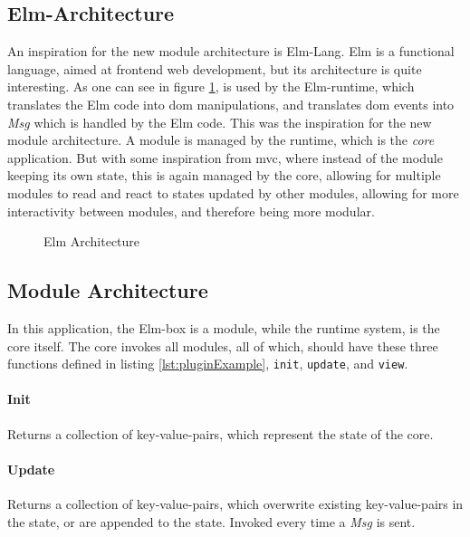 \subsection{Elm-Architecture}

An inspiration for the new module architecture is Elm-Lang. Elm is a functional
language, aimed at frontend web development, but its architecture is quite
interesting. As one can see in figure \ref{fig:elmArchitecture}, is used by the
Elm-runtime, which translates the Elm code into \gls{dom} manipulations, and
translates \gls{dom} events into \textit{Msg} which is handled by the Elm code.
This was the inspiration for the new module architecture. A module is managed by
the runtime, which is the \textit{core} application. But with some inspiration
from \gls{mvc}, where instead of the module keeping its own state, this is again
managed by the core, allowing for multiple modules to read and react to states
updated by other modules, allowing for more interactivity between modules, and
therefore being more modular.


\begin{figure}
  \centering
  
  \caption{Elm Architecture}
  \label{fig:elmArchitecture}
\end{figure}

\subsection{Module Architecture}

In this application, the Elm-box is a module, while the runtime system, is the
core itself. The core invokes all modules, all of which, should have these three
functions defined in listing \ref{lst:pluginExample}, \lstinline{init},
\lstinline{update}, and \lstinline{view}.

\paragraph{Init} Returns a collection of key-value-pairs, which represent
the state of the core.

\paragraph{Update} Returns a collection of key-value-pairs, which
overwrite existing key-value-pairs in the state, or are appended to the state.
Invoked every time a \textit{Msg} is sent.

